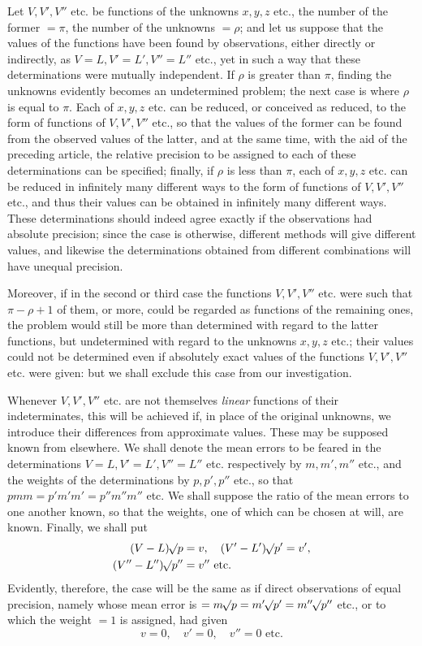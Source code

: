 Let \(V,V',V''\) etc. be functions of the unknowns \(x,y,z\) etc., the number of the former \(=\pi\), the number of the unknowns \(=\rho\); and let us suppose that the values of the functions have been found by observations, either directly or indirectly, as \(V=L,V'=L',V''=L''\) etc., yet in such a way that these determinations were mutually independent. If \(\rho\) is greater than \(\pi\), finding the unknowns evidently becomes an undetermined problem; the next case is where \(\rho\) is equal to \(\pi\). Each of \(x,y,z\) etc. can be reduced, or conceived as reduced, to the form of functions of \(V,V',V''\) etc., so that the values of the former can be found from the observed values of the latter, and at the same time, with the aid of the preceding article, the relative precision to be assigned to each of these determinations can be specified; finally, if \(\rho\) is less than \(\pi\), each of \(x,y,z\) etc. can be reduced in infinitely many different ways to the form of functions of \(V,V',V''\) etc., and thus their values can be obtained in infinitely many different ways. These determinations should indeed agree exactly if the observations had absolute precision; since the case is otherwise, different methods will give different values, and likewise the determinations obtained from different combinations will have unequal precision.

Moreover, if in the second or third case the functions \(V,V',V''\) etc. were such that \(\pi-\rho+1\) of them, or more, could be regarded as functions of the remaining ones, the problem would still be more than determined with regard to the latter functions, but undetermined with regard to the unknowns \(x,y,z\) etc.; their values could not be determined even if absolutely exact values of the functions \(V,V',V''\) etc. were given: but we shall exclude this case from our investigation.

Whenever \(V,V',V''\) etc. are not themselves \textit{linear} functions of their indeterminates, this will be achieved if, in place of the original unknowns, we introduce their differences from approximate values. These may be supposed known from elsewhere. We shall denote the mean errors to be feared in the determinations \(V=L,V'=L',V''=L''\) etc. respectively by \(m,m',m''\) etc., and the weights of the determinations by \(p,p',p''\) etc., so that \(pmm=p'm'm'=p''m''m''\) etc. We shall suppose the ratio of the mean errors to one another known, so that the weights, one of which can be chosen at will, are known. Finally, we shall put
\[
\begin{aligned}
(V-L)\mathord{{}^{}\!\surd}p&=v,\quad(V'-L')\mathord{{}^{}\!\surd}p'=v',\\
(V''-L'')\mathord{{}^{}\!\surd}p''&=v''\text{ etc.}
\end{aligned}
\]
Evidently, therefore, the case will be the same as if direct observations of equal precision, namely whose mean error is \(=m\mathord{{}^{}\!\surd}p=m'\mathord{{}^{}\!\surd}p'=m''\mathord{{}^{}\!\surd}p''\) etc., or to which the weight \(=1\) is assigned, had given
\[
v=0,\quad v'=0,\quad v''=0\text{ etc.}
\]

\clearpage
